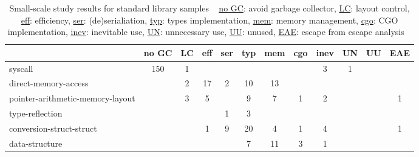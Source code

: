 \begin{table}[h]
    \caption[Small-scale study results for standard library samples]%
        {Small-scale study results for standard library samples \newline \tiny ~ \newline \small
            \underline{no GC}: avoid garbage collector, \underline{LC}: layout control, \underline{eff}: efficiency,
            \underline{ser}: (de)serialiation, \underline{typ}: types implementation, \underline{mem}: memory management,
            \underline{cgo}: CGO implementation, \underline{inev}: inevitable use, \underline{UN}: unnecessary use,
            \underline{UU}: unused, \underline{EAE}: escape from escape analysis \newline \tiny ~}
    \label{tbl:survey-small-results-std}
    \begin{tabularx}{\textwidth}{Xccccccccccc}
        \toprule
                                          & no GC & LC & eff & ser & typ & mem & cgo & inev & UN & UU & EAE \\
        \midrule
                                  syscall &   150 &              1 &            &               &       &        &     &          3 &           1 &        &                        \\
        \rowcolor{verylightgray}
                     direct-memory-access &       &              2 &         17 &             2 &    10 &     13 &     &            &             &        &                        \\
         pointer-arithmetic-memory-layout &       &              3 &          5 &               &     9 &      7 &   1 &          2 &             &        &                      1 \\
        \rowcolor{verylightgray}
                          type-reflection &       &                &            &             1 &     3 &        &     &            &             &        &                        \\
                 conversion-struct-struct &       &                &          1 &             9 &    20 &      4 &   1 &          4 &             &        &                      1 \\
        \rowcolor{verylightgray}
                           data-structure &       &                &            &               &     7 &     11 &   3 &          1 &             &        &                        \\

\end{tabularx}
\end{table}
